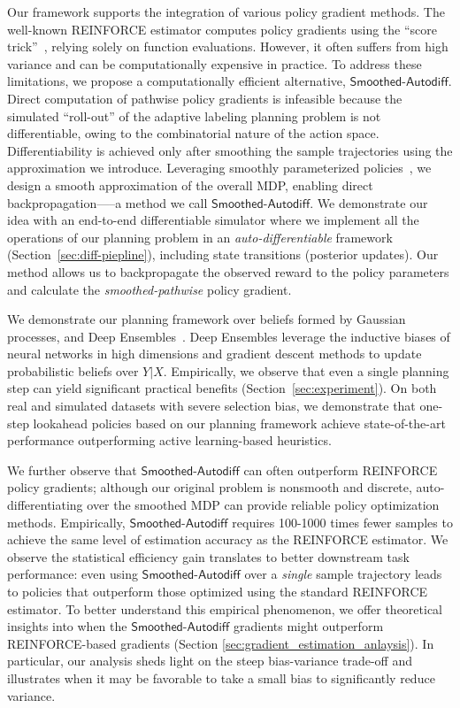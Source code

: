 Our framework supports the integration of various policy gradient methods. The well-known \textsf{REINFORCE} estimator  computes policy gradients using the ``score trick''~\citep{SuttonBa18, DuLiXuSpWuRuMa20}, relying solely on function evaluations.  However, it often suffers from high variance
and can be computationally expensive in practice. To address these limitations, we propose a computationally efficient alternative, $\mathsf{Smoothed\text{-}Autodiff}$. Direct computation of pathwise policy gradients is infeasible because the simulated
``roll-out'' of the adaptive labeling planning problem is not differentiable, owing to the combinatorial nature of the action space.  Differentiability is achieved only after smoothing the sample trajectories using the approximation we introduce.
Leveraging smoothly parameterized policies~\citep{XieEr19},
 we design a smooth approximation of the overall MDP, enabling direct backpropagation—--a method we call $\mathsf{Smoothed\text{-}Autodiff}$.
 We demonstrate our idea with an end-to-end differentiable simulator where we implement all the operations of our planning problem in an \emph{auto-differentiable} framework (Section~\ref{sec:diff-piepline}), including state transitions (posterior updates). Our method allows us to backpropagate the
observed reward to the policy parameters and calculate the \emph{smoothed-pathwise} policy gradient. 

We demonstrate our planning
framework over beliefs formed by Gaussian processes, and Deep Ensembles~\citep{LakshminarayananPrBl17,OsbandAsCa18}. Deep Ensembles leverage the inductive biases of neural
networks in high dimensions
and gradient descent methods to update probabilistic beliefs over
$Y|X$. 
Empirically, we observe that even a single planning step can yield
significant practical benefits (Section~\ref{sec:experiment}). 
On both real and
simulated datasets with severe selection bias, we demonstrate that one-step
lookahead policies based on our planning framework achieve
state-of-the-art performance outperforming
active learning-based heuristics. 

We further observe that $\mathsf{Smoothed\text{-}Autodiff}$
can often outperform \textsf{REINFORCE} policy gradients; 
although our original problem is nonsmooth and discrete,
auto-differentiating over the smoothed MDP can provide reliable policy optimization methods. 
Empirically, $\mathsf{Smoothed\text{-}Autodiff}$ requires 100-1000 times fewer samples to achieve the same level of estimation accuracy as the \textsf{REINFORCE} estimator. We observe the statistical efficiency gain translates to better downstream task performance: even using $\mathsf{Smoothed\text{-}Autodiff}$ over 
a \emph{single} sample trajectory leads to policies that outperform those optimized using the standard \textsf{REINFORCE} estimator.
To better understand this empirical phenomenon, we offer theoretical insights into when the $\mathsf{Smoothed\text{-}Autodiff}$ gradients might outperform \textsf{REINFORCE}-based gradients (Section \ref{sec:gradient_estimation_anlaysis}). In particular, our analysis sheds light on the steep bias-variance trade-off and illustrates when it may be favorable to take a small bias to significantly reduce variance.


